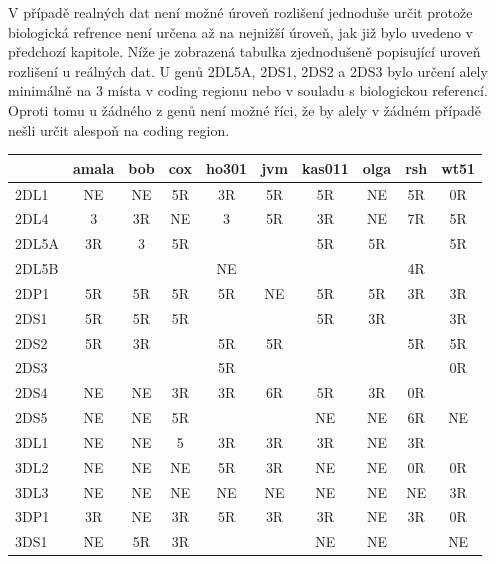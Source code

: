 \documentclass[czech,DP]{thesiskiv}
\numberwithin{equation}{section}
\begin{document}
\noindent
V případě realných dat není možné úroveň rozlišení jednoduše určit protože biologická refrence není určena až na nejnižší úroveň, jak již bylo uvedeno v předchozí kapitole. Níže je zobrazená tabulka zjednodušeně popisující uroveň rozlišení u reálných dat. U genů 2DL5A, 2DS1, 2DS2 a 2DS3 bylo určení alely minimálně na 3 místa v coding regionu nebo v souladu s biologickou referencí. Oproti tomu u žádného z genů není možné říci, že by alely v žádném případě nešli určit alespoň na coding region.

\begin{center}
\tiny
{}
\begin{tabular}{l || c | c | c | c | c | c | c | c | c}
& amala & bob & cox & ho301 & jvm & kas011 & olga & rsh & wt51  \\
\hline
\hline
2DL1 & NE & NE & 5R & 3R & 5R & 5R & NE & 5R & 0R\\
2DL4 & 3 & 3R & NE & 3 & 5R & 3R & NE & 7R & 5R \\
2DL5A & 3R & 3 & 5R & &  & 5R & 5R & & 5R\\ 
2DL5B &  &  &  & NE & &  & & 4R & \\
2DP1 & 5R & 5R & 5R & 5R & NE & 5R & 5R & 3R & 3R \\
2DS1 & 5R & 5R & 5R & & & 5R & 3R & & 3R\\
2DS2  & 5R & 3R & & 5R & 5R & & & 5R & 5R\\ 
2DS3 & &  & & 5R & & & & & 0R\\
2DS4 & NE & NE & 3R & 3R & 6R & 5R & 3R & 0R &  \\
2DS5 & NE & NE & 5R & & & NE & NE & 6R & NE \\
3DL1 & NE & NE & 5 & 3R & 3R & 3R & NE & 3R &  \\
3DL2 & NE & NE & NE & 5R & 3R & NE & NE & 0R & 0R\\ 
3DL3 & NE & NE & NE & NE & NE & NE & NE & NE & 3R\\
3DP1 & 3R & NE & 3R & 5R & 3R & 3R & NE & 3R & 0R\\
3DS1 & NE & 5R & 3R &  & &  NE & NE & & NE\\


\end{tabular}
\end{center}
\end{document}
